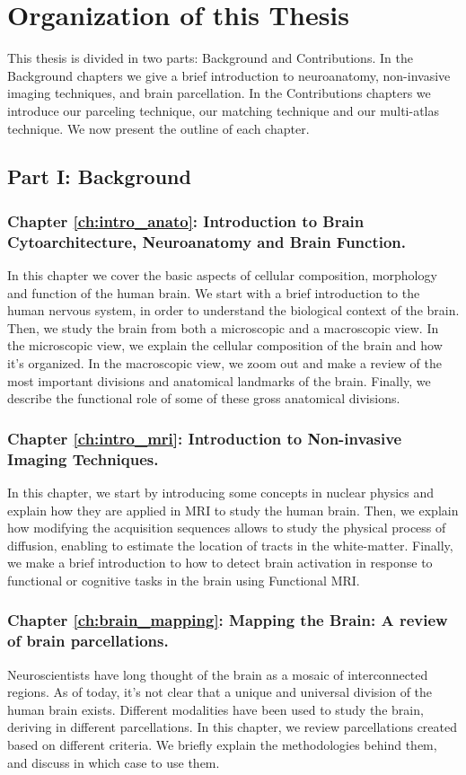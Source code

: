 \section*{Organization of this Thesis}

This thesis is divided in two parts: Background and Contributions. In the
Background chapters we give a brief introduction to neuroanatomy, non-invasive
imaging techniques, and brain parcellation. In the Contributions chapters we
introduce our parceling technique, our matching technique and our multi-atlas
technique. We now present the outline of each chapter.

\subsection{Part I: Background}

\subsubsection{Chapter \ref{ch:intro_anato}: Introduction to Brain Cytoarchitecture, Neuroanatomy and Brain Function.}
In this chapter we cover the basic aspects of cellular composition, morphology
and function of the human brain. We start with a brief introduction to the
human nervous system, in order to understand the biological context of the brain.
Then, we study the brain from both a microscopic and a macroscopic view. In the
microscopic view, we explain the cellular composition of the brain and how it’s
organized. In the macroscopic view, we zoom out and make a review of the most 
important divisions and anatomical landmarks of the brain. Finally, we describe
the functional role of some of these gross anatomical divisions.

\subsubsection{Chapter \ref{ch:intro_mri}: Introduction to Non-invasive Imaging Techniques.}
In this chapter, we start by introducing some concepts in
nuclear physics and explain how they are applied in MRI to study the human
brain. Then, we explain how modifying the acquisition sequences allows to
study the physical process of diffusion, enabling to estimate the location
of tracts in the white-matter. Finally, we make a brief introduction to how to
detect brain activation in response to functional or cognitive tasks in the
brain using Functional MRI.

\subsubsection{Chapter \ref{ch:brain_mapping}: Mapping the Brain: A review of brain parcellations.}
Neuroscientists have long thought of the brain as a mosaic of interconnected
regions. As of today, it's not clear that a unique and universal
division of the human brain exists. Different modalities have been used to
study the brain, deriving in different parcellations. In this chapter, we review
parcellations created based on different criteria. We briefly explain the
methodologies behind them, and discuss in which case to use them.

